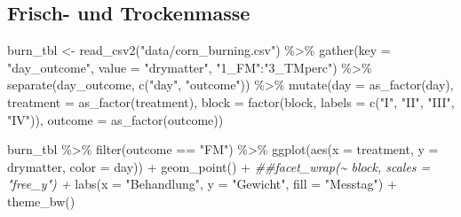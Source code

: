 \documentclass[
  letterpaper,
  DIV=11,
  oneside]{scrreport}
\newenvironment{Shaded}{\begin{snugshade}}{\end{snugshade}}
\newcommand{\AttributeTok}[1]{\textcolor[rgb]{0.40,0.45,0.13}{#1}}
\newcommand{\DocumentationTok}[1]{\textcolor[rgb]{0.37,0.37,0.37}{\textit{#1}}}
\newcommand{\FunctionTok}[1]{\textcolor[rgb]{0.28,0.35,0.67}{#1}}
\newcommand{\NormalTok}[1]{\textcolor[rgb]{0.00,0.23,0.31}{#1}}
\newcommand{\OtherTok}[1]{\textcolor[rgb]{0.00,0.23,0.31}{#1}}
\newcommand{\SpecialCharTok}[1]{\textcolor[rgb]{0.37,0.37,0.37}{#1}}
\newcommand{\StringTok}[1]{\textcolor[rgb]{0.13,0.47,0.30}{#1}}
\begin{document}
\hypertarget{frisch--und-trockenmasse}{%
\subsection{Frisch- und Trockenmasse}\label{frisch--und-trockenmasse}}

\begin{Shaded}
\begin{Highlighting}[]
\NormalTok{burn\_tbl }\OtherTok{\textless{}{-}} \FunctionTok{read\_csv2}\NormalTok{(}\StringTok{"data/corn\_burning.csv"}\NormalTok{) }\SpecialCharTok{\%\textgreater{}\%} 
  \FunctionTok{gather}\NormalTok{(}\AttributeTok{key =} \StringTok{"day\_outcome"}\NormalTok{, }\AttributeTok{value =} \StringTok{"drymatter"}\NormalTok{, }\StringTok{"1\_FM"}\SpecialCharTok{:}\StringTok{"3\_TMperc"}\NormalTok{) }\SpecialCharTok{\%\textgreater{}\%}
  \FunctionTok{separate}\NormalTok{(day\_outcome, }\FunctionTok{c}\NormalTok{(}\StringTok{"day"}\NormalTok{, }\StringTok{"outcome"}\NormalTok{)) }\SpecialCharTok{\%\textgreater{}\%} 
  \FunctionTok{mutate}\NormalTok{(}\AttributeTok{day =} \FunctionTok{as\_factor}\NormalTok{(day),}
         \AttributeTok{treatment =} \FunctionTok{as\_factor}\NormalTok{(treatment),}
         \AttributeTok{block =} \FunctionTok{factor}\NormalTok{(block, }\AttributeTok{labels =} \FunctionTok{c}\NormalTok{(}\StringTok{"I"}\NormalTok{, }\StringTok{"II"}\NormalTok{, }\StringTok{"III"}\NormalTok{, }\StringTok{"IV"}\NormalTok{)),}
         \AttributeTok{outcome =} \FunctionTok{as\_factor}\NormalTok{(outcome)) }
\end{Highlighting}
\end{Shaded}

\begin{Shaded}
\begin{Highlighting}[]
\NormalTok{burn\_tbl }\SpecialCharTok{\%\textgreater{}\%} 
  \FunctionTok{filter}\NormalTok{(outcome }\SpecialCharTok{==} \StringTok{"FM"}\NormalTok{) }\SpecialCharTok{\%\textgreater{}\%} 
  \FunctionTok{ggplot}\NormalTok{(}\FunctionTok{aes}\NormalTok{(}\AttributeTok{x =}\NormalTok{ treatment, }\AttributeTok{y =}\NormalTok{ drymatter, }\AttributeTok{color =}\NormalTok{ day)) }\SpecialCharTok{+}
  \FunctionTok{geom\_point}\NormalTok{() }\SpecialCharTok{+}
  \DocumentationTok{\#\#facet\_wrap(\textasciitilde{} block, scales = "free\_y") +}
  \FunctionTok{labs}\NormalTok{(}\AttributeTok{x =} \StringTok{"Behandlung"}\NormalTok{, }\AttributeTok{y =} \StringTok{"Gewicht"}\NormalTok{, }\AttributeTok{fill =} \StringTok{"Messtag"}\NormalTok{) }\SpecialCharTok{+}
  \FunctionTok{theme\_bw}\NormalTok{()}
\end{Highlighting}
\end{Shaded}
\end{document}
